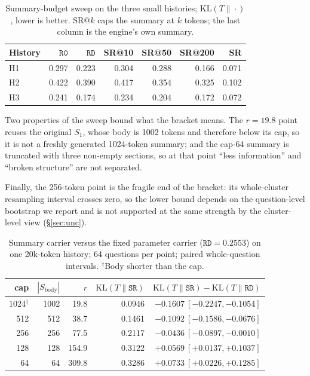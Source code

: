 \documentclass[sigconf,nonacm]{acmart}
\newcommand{\KL}{\mathrm{KL}}
\newcommand{\St}{\texttt{SR}}
\newcommand{\armR}{\texttt{R0}}
\newcommand{\armRD}{\texttt{RD}}
\begin{document}
\begin{table}[t]
\centering
\small
\setlength{\tabcolsep}{4pt}
\begin{tabular}{lrrrrrr}
\toprule
History & $\armR$ & $\armRD$ & SR@10 & SR@50 & SR@200 & SR \\
\midrule
H1 & 0.297 & 0.223 & 0.304 & 0.288 & 0.166 & 0.071 \\
H2 & 0.422 & 0.390 & 0.417 & 0.354 & 0.325 & 0.102 \\
H3 & 0.241 & 0.174 & 0.234 & 0.204 & 0.172 & 0.072 \\
\bottomrule
\end{tabular}
\caption{Summary-budget sweep on the three small histories; $\KL(T\|\cdot)$, lower is better. SR@$k$ caps the
summary at $k$ tokens; the last column is the engine's own summary.}
\label{tab:threeH}
\end{table}

Two properties of the sweep bound what the bracket means. The $r=19.8$ point
reuses the original $S_1$, whose body is 1002 tokens and therefore below its cap, so it is not a freshly
generated 1024-token summary; and the cap-64 summary is truncated with three non-empty sections, so at that
point ``less information'' and ``broken structure'' are not separated.

Finally, the 256-token point is the fragile end of the bracket: its whole-cluster resampling interval crosses
zero, so the lower bound depends on the question-level bootstrap we report and is not supported at the same
strength by the cluster-level view (\S\ref{sec:unc}).

\begin{table}[t]
\centering
\footnotesize
\begin{tabular}{rrrrr}
\toprule
cap & $|S_{\text{body}}|$ & $r$ & $\KL(T\|\St)$ & $\KL(T\|\St)-\KL(T\|\armRD)$ \\
\midrule
1024$^{\dagger}$ & 1002 & 19.8 & 0.0946 & $-0.1607\ [-0.2247,-0.1054]$ \\
512 & 512 & 38.7 & 0.1461 & $-0.1092\ [-0.1586,-0.0676]$ \\
256 & 256 & 77.5 & 0.2117 & $-0.0436\ [-0.0897,-0.0010]$ \\
128 & 128 & 154.9 & 0.3122 & $+0.0569\ [+0.0137,+0.1037]$ \\
64 & 64 & 309.8 & 0.3286 & $+0.0733\ [+0.0226,+0.1285]$ \\
\bottomrule
\end{tabular}
\caption{Summary carrier versus the fixed parameter carrier ($\armRD=0.2553$) on one 20k-token history; 64
questions per point; paired whole-question intervals. $^{\dagger}$Body shorter than the cap.}
\label{tab:rstar}
\end{table}
\end{document}
